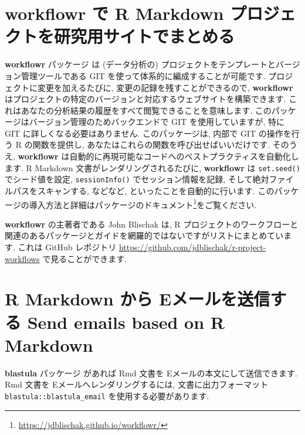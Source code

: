 \documentclass[
  11pt,
  lualatex,
  ja=standard]{bxjsreport}
\renewcommand{\href}[2]{#2\footnote{\url{#1}}}
\begin{document}
\hypertarget{workflowr}{%
\section{\texorpdfstring{\textbf{workflowr} で R Markdown プロジェクトを研究用サイトでまとめる}{workflowr で R Markdown プロジェクトを研究用サイトでまとめる}}\label{workflowr}}

\textbf{workflowr} パッケージ \autocite{R-workflowr,workflowr2019}は (データ分析の) プロジェクトをテンプレートとバージョン管理ツールである GIT を使って体系的に編成することが可能です. プロジェクトに変更を加えるたびに, 変更の記録を残すことができるので, \textbf{workflowr} はプロジェクトの特定のバージョンと対応するウェブサイトを構築できます. これはあなたの分析結果の履歴をすべて閲覧できることを意味します. このパッケージはバージョン管理のためバックエンドで GIT を使用していますが, 特に GIT に詳しくなる必要はありません. このパッケージは, 内部で GIT の操作を行う R の関数を提供し, あなたはこれらの関数を呼び出せばいいだけです. そのうえ, \textbf{workflowr} は自動的に再現可能なコードへのベストプラクティスを自動化します. R Markdown 文書がレンダリングされるたびに, \textbf{workflowr} は \texttt{set.seed()} でシード値を設定, \texttt{sessionInfo()} でセッション情報を記録, そして絶対ファイルパスをスキャンする, などなど, といったことを自動的に行います. このパッケージの導入方法と詳細は\href{https://jdblischak.github.io/workflowr/}{パッケージのドキュメント}をご覧ください.

\textbf{workflowr} の主著者である John Blischak は, R プロジェクトのワークフローと関連のあるパッケージとガイドを網羅的ではないですがリストにまとめています. これは GitHub レポジトリ \url{https://github.com/jdblischak/r-project-workflows} で見ることができます.

\hypertarget{blastula-email}{%
\section{R Markdown から Eメールを送信する Send emails based on R Markdown}\label{blastula-email}}

\textbf{blastula} パッケージ \autocite{R-blastula}があれば Rmd 文書を Eメールの本文にして送信できます. Rmd 文書を Eメールへレンダリングするには, 文書に出力フォーマット \texttt{blastula::blastula\_email} を使用する必要があります.
\end{document}
